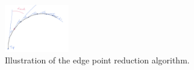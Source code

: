 \documentclass[]{pracamgr}
\begin{document}
      \begin{figure}
        \begin{center}
          \vspace{-10pt}
          \includegraphics[width=0.25\textwidth]{figs/descritization_reducing.jpg}
        \end{center}
        \caption{Illustration of the edge point reduction algorithm.}
        \label{descritization_reducing}
      \end{figure}
\end{document}

